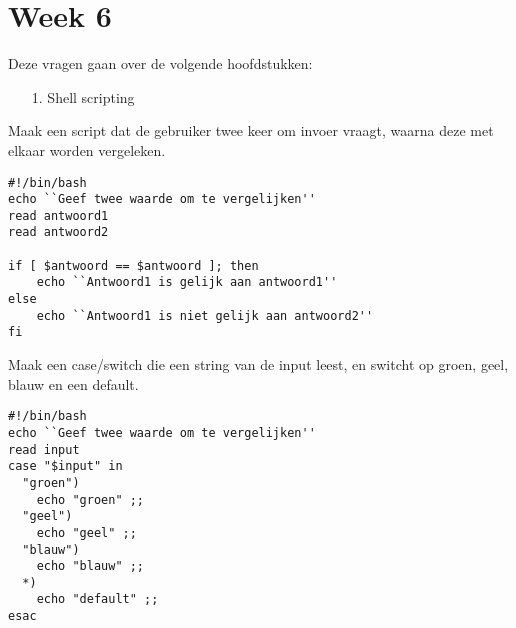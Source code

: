 %
%
%
%

\section{Week 6}
Deze vragen gaan over de volgende hoofdstukken:
\begin{itemize}
\item[1.] Shell scripting
\end{itemize}

\question[15] Maak een script dat de gebruiker twee keer om invoer vraagt, waarna deze met elkaar worden vergeleken.
\begin{solution}
\begin{lstlisting}
#!/bin/bash
echo ``Geef twee waarde om te vergelijken''
read antwoord1
read antwoord2

if [ $antwoord == $antwoord ]; then
    echo ``Antwoord1 is gelijk aan antwoord1''
else
    echo ``Antwoord1 is niet gelijk aan antwoord2''
fi
\end{lstlisting}
\end{solution}

\question[15] Maak een case/switch die een string van de input leest, en switcht op groen, geel, blauw en een default.
\begin{solution}
\begin{lstlisting}
#!/bin/bash
echo ``Geef twee waarde om te vergelijken''
read input
case "$input" in 
  "groen")
    echo "groen" ;;
  "geel")
    echo "geel" ;;
  "blauw")
    echo "blauw" ;;
  *)
    echo "default" ;;
esac
\end{lstlisting}%
\end{solution}

